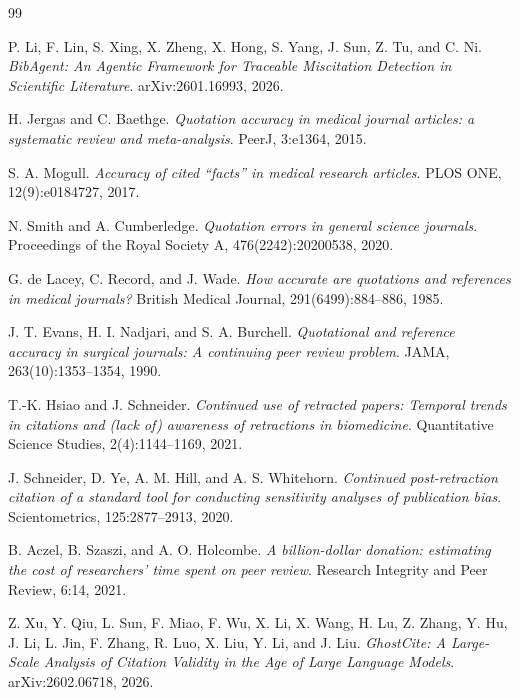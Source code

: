 \documentclass{article}
\begin{document}
{\footnotesize

\begin{thebibliography}{99}

\setlength{\itemsep}{0pt plus 0.2ex}

P. Li, F. Lin, S. Xing, X. Zheng, X. Hong, S. Yang, J. Sun, Z. Tu, and C. Ni.
\textit{BibAgent: An Agentic Framework for Traceable Miscitation Detection in Scientific Literature}.
arXiv:2601.16993, 2026.

H. Jergas and C. Baethge.
\textit{Quotation accuracy in medical journal articles: a systematic review and meta-analysis}.
PeerJ, 3:e1364, 2015.

S. A. Mogull.
\textit{Accuracy of cited ``facts'' in medical research articles}.
PLOS ONE, 12(9):e0184727, 2017.

N. Smith and A. Cumberledge.
\textit{Quotation errors in general science journals}.
Proceedings of the Royal Society A, 476(2242):20200538, 2020.

G. de Lacey, C. Record, and J. Wade.
\textit{How accurate are quotations and references in medical journals?}
British Medical Journal, 291(6499):884--886, 1985.

J. T. Evans, H. I. Nadjari, and S. A. Burchell.
\textit{Quotational and reference accuracy in surgical journals: A continuing peer review problem}.
JAMA, 263(10):1353--1354, 1990.

T.-K. Hsiao and J. Schneider.
\textit{Continued use of retracted papers: Temporal trends in citations and (lack of) awareness of retractions in biomedicine}.
Quantitative Science Studies, 2(4):1144--1169, 2021.

J. Schneider, D. Ye, A. M. Hill, and A. S. Whitehorn.
\textit{Continued post-retraction citation of a standard tool for conducting sensitivity analyses of publication bias}.
Scientometrics, 125:2877--2913, 2020.

B. Aczel, B. Szaszi, and A. O. Holcombe.
\textit{A billion-dollar donation: estimating the cost of researchers' time spent on peer review}.
Research Integrity and Peer Review, 6:14, 2021.

Z. Xu, Y. Qiu, L. Sun, F. Miao, F. Wu, X. Li, X. Wang, H. Lu, Z. Zhang, Y. Hu, J. Li, L. Jin, F. Zhang, R. Luo, X. Liu, Y. Li, and J. Liu.
\textit{GhostCite: A Large-Scale Analysis of Citation Validity in the Age of Large Language Models}.
arXiv:2602.06718, 2026.


\end{thebibliography}}
\end{document}
